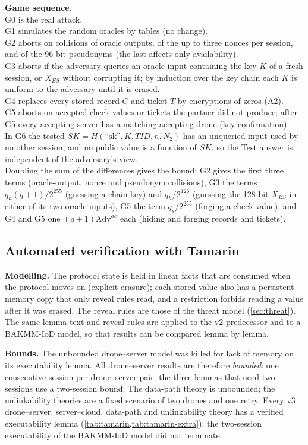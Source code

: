 \textbf{Game sequence.} \\
G0 is the real attack. \\
G1 simulates the random oracles by tables (no change). \\
G2 aborts on collisions of oracle outputs, of the up to three nonces per session, and of the 96-bit pseudonyms (the last affects only availability). \\
G3 aborts if the adversary queries an oracle input containing the key $K$ of a fresh session, or $X_{ES}$ without corrupting
it; by induction over the key chain each $K$ is uniform to the adversary until it is erased. \\
G4 replaces every stored record $C$ and ticket $T$ by encryptions of zeros (A2). \\
G5 aborts on accepted check values or tickets the partner did not produce; after G5 every accepting server has a matching accepting drone (key confirmation). \\
In G6 the tested $SK = H(\text{``sk''}, K, TID, n, N_2)$ has an unqueried input used by no other session, and no public value is a function of
$SK$, so the Test answer is independent of the adversary's view. \\ 
Doubling the sum of the differences gives the bound: G2
gives the first three terms (oracle-output, nonce and pseudonym collisions), G3 the terms $q_h(q+1)/2^{255}$ (guessing a
chain key) and $q_h/2^{126}$ (guessing the 128-bit $X_{ES}$ in either of its two oracle inputs), G5 the term $q_s/2^{255}$
(forging a check value), and G4 and G5 one $(q+1)\mathrm{Adv}^{ae}$ each (hiding and forging records and tickets).

\subsection{Automated verification with Tamarin}\label{sec:tamarin}
\textbf{Modelling.} The protocol state is held in linear facts that are consumed when the protocol moves on (explicit
erasure); each stored value also has a persistent memory copy that only reveal rules read, and a restriction forbids reading a
value after it was erased. The reveal rules are those of the threat model (\cref{sec:threat}). The same lemma text and reveal
rules are applied to the v2 predecessor and to a BAKMM-IoD model, so that results can be compared lemma by lemma.

\textbf{Bounds.} The unbounded drone--server model was killed for lack of memory on its executability lemma. All drone--server
results are therefore \emph{bounded}: one consecutive session per drone--server pair; the three lemmas that need two sessions
use a two-session bound. The data-path theory is unbounded; the unlinkability theories are a fixed scenario of two drones and
one retry. Every v3 drone--server, server--cloud, data-path and unlinkability theory has a verified executability lemma
(\cref{tab:tamarin,tab:tamarin-extra}); the two-session executability of the BAKMM-IoD model did not terminate.

